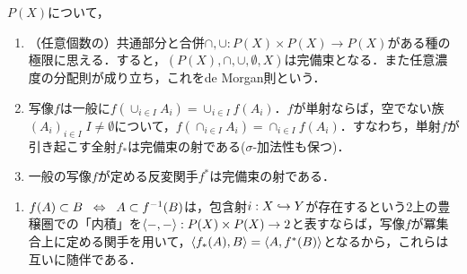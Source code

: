 \documentclass[uplatex, dvipdfmx]{jsreport}
\begin{document}
\begin{definition}
    $P(X)$について，
    \begin{enumerate}
        \item （任意個数の）共通部分と合併$\cap,\cup:P(X)\times P(X)\to P(X)$がある種の極限に思える．すると，$(P(X),\cap,\cup,\emptyset,X)$は完備束となる．また任意濃度の分配則が成り立ち，これをde Morgan則という．
        \item 写像$f$は一般に$f(\cup_{i\in I}A_i)=\cup_{i\in I}f(A_i)$．$f$が単射ならば，空でない族$(A_i)_{i\in I}\;I\ne\emptyset$について，$f(\cap_{i\in I}A_i)=\cap_{i\in I}f(A_i)$．すなわち，単射$f$が引き起こす全射$f_*$は完備束の射である($\sigma$-加法性も保つ)．
        \item 一般の写像$f$が定める反変関手$f^*$は完備束の射である．
    \end{enumerate}
\end{definition}

\begin{definition}[mapping]\mbox{}
    \begin{enumerate}
        \item $f(A)\subset B\;\;\Leftrightarrow\;\; A\subset f^{-1}(B)$は，包含射$i:X\hookrightarrow Y$が存在するという2上の豊穣圏での「内積」を$\langle-,-\rangle:P(X)\times P(X)\to 2$と表すならば，写像$f$が冪集合上に定める関手を用いて，$\langle f_*(A),B\rangle=\langle A,f^*(B)\rangle$となるから，これらは互いに随伴である．
    \end{enumerate}
\end{definition}
\end{document}
